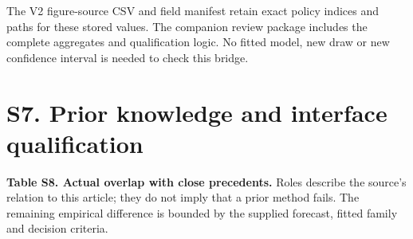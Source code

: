 \documentclass[
  british,
  11pt,
]{article}
\begin{document}
The V2 figure-source CSV and field manifest retain exact policy indices
and paths for these stored values. The companion review package includes
the complete aggregates and qualification logic. No fitted model, new
draw or new confidence interval is needed to check this bridge.


\section{S7. Prior knowledge and interface
qualification}\label{s7.-prior-knowledge-and-interface-qualification}

\textbf{Table S8. Actual overlap with close precedents.} Roles describe
the source's relation to this article; they do not imply that a prior
method fails. The remaining empirical difference is bounded by the
supplied forecast, fitted family and decision criteria.
\end{document}
